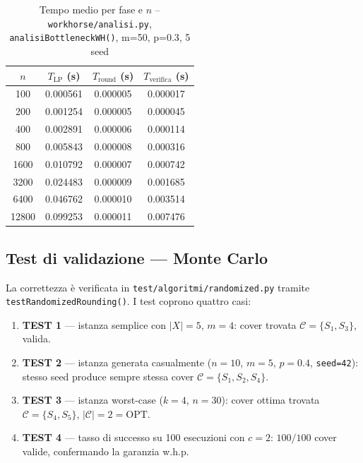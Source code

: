 \documentclass[12pt, a4paper]{article}
\begin{document}
\begin{table}[H]
\centering
\caption{Tempo medio per fase e $n$ -- 
\texttt{workhorse/analisi.py}, \texttt{analisiBottleneckWH()}, m=50, p=0.3, 5 seed}
\label{tab:bottleneck_n}
\begin{tabular}{cccc}
\toprule
$n$ & $T_{\mathrm{LP}}$ (s) & $T_{\mathrm{round}}$ (s) & $T_{\mathrm{verifica}}$ (s) \\
\midrule
100   & 0.000561 & 0.000005 & 0.000017 \\
200   & 0.001254 & 0.000005 & 0.000045 \\
400   & 0.002891 & 0.000006 & 0.000114 \\
800   & 0.005843 & 0.000008 & 0.000316 \\
1600  & 0.010792 & 0.000007 & 0.000742 \\
3200  & 0.024483 & 0.000009 & 0.001685 \\
6400  & 0.046762 & 0.000010 & 0.003514 \\
12800 & 0.099253 & 0.000011 & 0.007476 \\
\bottomrule
\end{tabular}
\end{table}

\subsection*{Test di validazione — Monte Carlo}

La correttezza \`e verificata in \texttt{test/algoritmi/randomized.py}
tramite \texttt{testRandomizedRounding()}. I test coprono quattro casi:

\begin{enumerate}
    \item \textbf{TEST 1} — istanza semplice con $|X|=5$, $m=4$:
    cover trovata $\mathcal{C} = \{S_1, S_3\}$, valida.

    \item \textbf{TEST 2} — istanza generata casualmente ($n=10$, $m=5$,
    $p=0.4$, \texttt{seed=42}): stesso seed produce sempre stessa cover
    $\mathcal{C} = \{S_1, S_2, S_4\}$.

    \item \textbf{TEST 3} — istanza worst-case ($k=4$, $n=30$):
    cover ottima trovata $\mathcal{C} = \{S_4, S_5\}$, $|\mathcal{C}| = 2 = \mathrm{OPT}$.

    \item \textbf{TEST 4} — tasso di successo su 100 esecuzioni con $c=2$:
    $100/100$ cover valide, confermando la garanzia w.h.p.
\end{enumerate}
\end{document}
